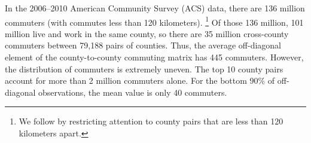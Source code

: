 In the 2006--2010 American Community Survey (ACS) data, there are 136 million commuters (with commutes less than 120 kilometers).%
\footnote{We follow  by restricting attention to county pairs that are less than 120 kilometers apart.}
Of those 136 million, 101 million live and work in the same county, so there are 35 million cross-county commuters between 79,188 pairs of counties.
Thus, the average off-diagonal element of the county-to-county commuting matrix has 445 commuters.
However, the distribution of commuters is extremely uneven. The top 10 county pairs account for more than 2 million commuters alone.
For the bottom 90\% of off-diagonal observations, the mean value is only 40 commuters.

